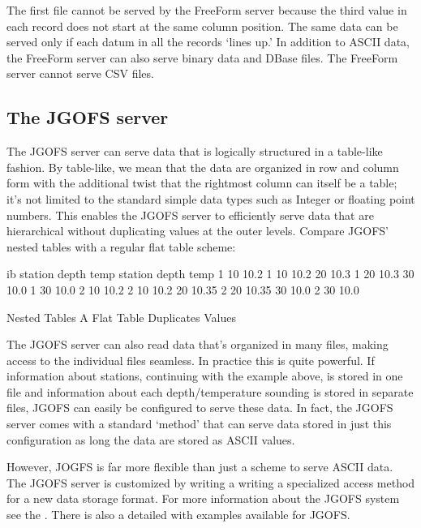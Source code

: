 \documentclass{dods-paper}
\begin{document}
The first file cannot be served by the FreeForm server because the
third value in each record does not start at the same column position.
The same data can be served only if each datum in all the records `lines
up.' In addition to ASCII data, the FreeForm server can also serve
binary data and DBase files.  The FreeForm server cannot serve CSV
files.


\subsection{The JGOFS server}

The JGOFS server can serve data that is logically structured in a
table-like fashion. By table-like, we mean that the data are organized
in row and column form with the additional twist that the rightmost
column can itself be a table; it's not limited to the standard simple
data types such as Integer or floating point numbers. This enables the
JGOFS server to efficiently serve data that are hierarchical without
duplicating values at the outer levels.  Compare JGOFS' nested tables
with a regular flat table scheme:
   
\begin{vcode}{ib}
station depth temp                         station depth temp
1       10    10.2                         1       10    10.2
        20    10.3                         1       20    10.3
        30    10.0                         1       30    10.0
2       10    10.2                         2       10    10.2
        20    10.35                        2       20    10.35
        30    10.0                         2       30    10.0
                   
   Nested Tables                      A Flat Table Duplicates Values
\end{vcode}

The JGOFS server can also read data that's organized in many files,
making access to the individual files seamless. In practice this is
quite powerful.  If information about stations, continuing with the
example above, is stored in one file and information about each
depth/temperature sounding is stored in separate files, JGOFS can
easily be configured to serve these data.  In fact, the JGOFS server
comes with a standard `method' that can serve data stored in just this
configuration as long the data are stored as ASCII values.

However, JOGFS is far more flexible than just a scheme to serve ASCII
data.  The JGOFS server is customized by writing a writing a
specialized access method for a new data storage format. For more
information about the JGOFS system see the .  There is
also a detailed  with examples
available for JGOFS.
\end{document}
